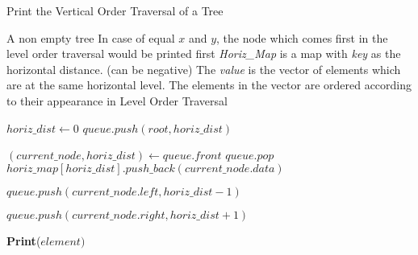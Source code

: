 \documentclass[12pt]{article}
\begin{document}
\begin{algorithm}

  \caption{Print the Vertical Order Traversal of a Tree}
  \begin{algorithmic}[1]
    \Require A non empty tree
    \Ensure In case of equal $x$ and $y$, the node which comes first
    in the level order traversal would be printed first
    \Statex
        \LeftComment \textit{Horiz\_Map} is a map with \textit{key} as the horizontal distance.  (can be negative)
        \LeftComment The \textit{value} is the vector of elements which are at the same horizontal level. 
        \LeftComment The elements in the vector are ordered according to their appearance in Level Order Traversal
        
        \Statex
        \State $horiz\_dist \gets 0$
        \State $queue.push(root,horiz\_dist)$
        
            \State $(current\_node, horiz\_dist) \gets queue.front $
            \State $queue.pop$
            \State $horiz\_map[horiz\_dist].push\_back(current\_node.data)$
            
                \State $queue.push( current\_node.left, horiz\_dist-1 )$
            \EndIf
            
                \State $queue.push(current\_node.right, horiz\_dist+1)$
            \EndIf
            
        \EndWhile
        \Statex
                \State \textbf{Print}($element)$ 
            \EndFor
        \EndFor
    \EndFunction
  \end{algorithmic}
  
\end{algorithm}
\end{document}
